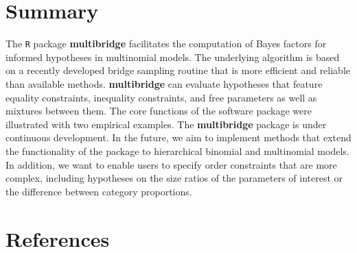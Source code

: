 \documentclass[
  english,
  man,floatsintext]{apa6}
\begin{document}
\hypertarget{summary}{%
\section{Summary}\label{summary}}

The \texttt{R} package \textbf{multibridge} facilitates the computation of Bayes factors for informed hypotheses in multinomial models. The underlying algorithm is based on a recently developed bridge sampling routine that is more efficient and reliable than available methods. \textbf{multibridge} can evaluate hypotheses that feature equality constraints, inequality constraints, and free parameters as well as mixtures between them. The core functions of the software package were illustrated with two empirical examples. The \textbf{multibridge} package is under continuous development. In the future, we aim to implement methods that extend the functionality of the package to hierarchical binomial and multinomial models. In addition, we want to enable users to specify order constraints that are more complex, including hypotheses on the size ratios of the parameters of interest or the difference between category proportions. 

\clearpage

\hypertarget{references}{%
\section{References}\label{references}}

\begingroup
\setlength{\parindent}{-0.5in}
\setlength{\leftskip}{0.5in}
\end{document}
